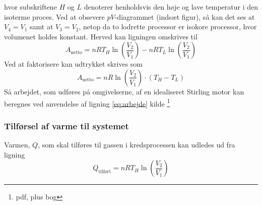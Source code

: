 \documentclass[SRC.tex]{subfiles}
\begin{document}
	hvor subskriftene \(H\) og \(L\) denoterer henholdsvis den høje og lave temperatur i den isoterme
	proces. Ved at obsevere \(pV\)-diagrammet (indsæt figur), så kan det ses at \(V_4 = V_1\) samt 
	at \(V_3 = V_2\), netop da to lodrette processor er isokore processor, hvor volumenet holdes konstant. Herved kan ligningen omskrives til
	\begin{equation}
	A_{\text{netto}} = nRT_H\ln\left(\frac{V_2}{V_1}\right)-nRT_L\ln\left(\frac{V_2}{V_1}\right)
	\end{equation}
	Ved at faktorisere kan udtrykket skrives som
	\begin{equation}
		A_{\text{netto}}= nR\ln\left(\frac{V_2}{V_1}\right)\cdot (T_H - T_L)
		\label{eq:arbejde}
	\end{equation}
	Så arbejdet, som udføres på omgivelserne, af en idealiseret Stirling motor kan beregnes ved anvendelse af ligning \eqref{eq:arbejde}
	kilde \footnote{pdf, plus bog}
	
	\subsubsection{Tilførsel af varme til systemet}
	Varmen, \(Q\), som skal tilføres til gassen i kredsprocessen kan udledes ud fra ligning
	\begin{equation}
		Q_{\text{tilført}} = nRT_H\ln\left(\frac{V_2}{V_1}\right)
		\label{eq:varme}
	\end{equation}
\end{document}
